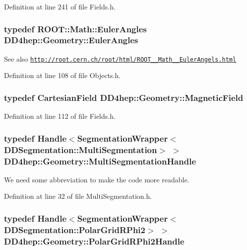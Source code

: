 Definition at line 241 of file Fields.h.\hypertarget{namespace_d_d4hep_1_1_geometry_a48c636127488441c543a2c7237cba0d1}{
\subsubsection[{EulerAngles}]{\setlength{\rightskip}{0pt plus 5cm}typedef ROOT::Math::EulerAngles {\bf DD4hep::Geometry::EulerAngles}}}
\label{namespace_d_d4hep_1_1_geometry_a48c636127488441c543a2c7237cba0d1}
\begin{DoxySeeAlso}{See also}
\href{http://root.cern.ch/root/html/ROOT__Math__EulerAngels.html}{\tt http://root.cern.ch/root/html/ROOT\_\-\_\-Math\_\-\_\-EulerAngels.html} 
\end{DoxySeeAlso}


Definition at line 108 of file Objects.h.\hypertarget{namespace_d_d4hep_1_1_geometry_a4335218852430195169d47112d47dde6}{
\subsubsection[{MagneticField}]{\setlength{\rightskip}{0pt plus 5cm}typedef {\bf CartesianField} {\bf DD4hep::Geometry::MagneticField}}}
\label{namespace_d_d4hep_1_1_geometry_a4335218852430195169d47112d47dde6}


Definition at line 112 of file Fields.h.\hypertarget{namespace_d_d4hep_1_1_geometry_a0cddd542681c17a184500750327bcb64}{
\subsubsection[{MultiSegmentationHandle}]{\setlength{\rightskip}{0pt plus 5cm}typedef {\bf Handle}$<${\bf SegmentationWrapper}$<${\bf DDSegmentation::MultiSegmentation}$>$ $>$ {\bf DD4hep::Geometry::MultiSegmentationHandle}}}
\label{namespace_d_d4hep_1_1_geometry_a0cddd542681c17a184500750327bcb64}


We need some abbreviation to make the code more readable. 

Definition at line 32 of file MultiSegmentation.h.\hypertarget{namespace_d_d4hep_1_1_geometry_a0cd92d5c1d6efd314dfa1a555faab017}{
\subsubsection[{PolarGridRPhi2Handle}]{\setlength{\rightskip}{0pt plus 5cm}typedef {\bf Handle}$<${\bf SegmentationWrapper}$<${\bf DDSegmentation::PolarGridRPhi2}$>$ $>$ {\bf DD4hep::Geometry::PolarGridRPhi2Handle}}}
\label{namespace_d_d4hep_1_1_geometry_a0cd92d5c1d6efd314dfa1a555faab017}


